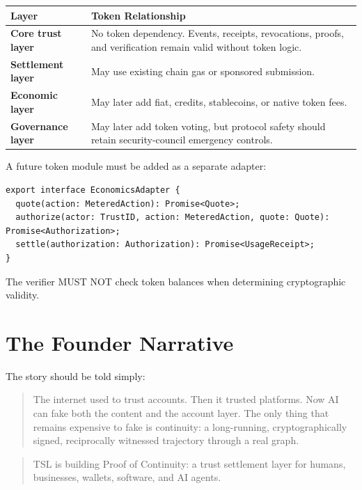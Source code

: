 \documentclass[11pt]{article}
\newcommand{\TSL}{\textsc{TSL}}
\begin{document}
\begin{center}
\begin{tabularx}{\textwidth}{>{\bfseries}p{} X}
\toprule
Layer & Token Relationship \\
\midrule
Core trust layer & No token dependency. Events, receipts, revocations, proofs, and verification remain valid without token logic. \\
Settlement layer & May use existing chain gas or sponsored submission. \\
Economic layer & May later add fiat, credits, stablecoins, or native token fees. \\
Governance layer & May later add token voting, but protocol safety should retain security-council emergency controls. \\
\bottomrule
\end{tabularx}
\end{center}

A future token module must be added as a separate adapter:

\begin{lstlisting}[style=tslcode]
export interface EconomicsAdapter {
  quote(action: MeteredAction): Promise<Quote>;
  authorize(actor: TrustID, action: MeteredAction, quote: Quote): Promise<Authorization>;
  settle(authorization: Authorization): Promise<UsageReceipt>;
}
\end{lstlisting}

The verifier MUST NOT check token balances when determining cryptographic validity.


\section{The Founder Narrative}

The story should be told simply:

\begin{quote}
The internet used to trust accounts. Then it trusted platforms. Now AI can fake both the content and the account layer. The only thing that remains expensive to fake is continuity: a long-running, cryptographically signed, reciprocally witnessed trajectory through a real graph.
\end{quote}

\begin{quote}
\TSL{} is building Proof of Continuity: a trust settlement layer for humans, businesses, wallets, software, and AI agents.
\end{quote}
\end{document}
